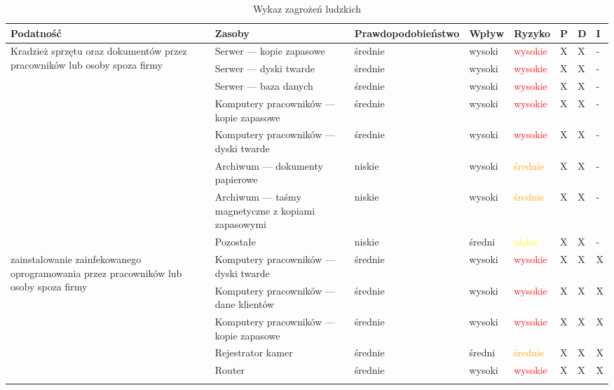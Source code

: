 \begin{landscape}
	\begin{longtable}[ht!]{|m{4cm}|m{6cm}|m{4.5cm}|m{2.5cm}|m{2.5cm}|m{0.5cm}|m{0.5cm}|m{0.5cm}|}
		\caption{Wykaz zagrożeń ludzkich}
		\label{tab::zagrozenia_ludzkie2} \\
		\hline
		\textbf{Podatność} & \textbf{Zasoby} & \textbf{Prawdopodobieństwo} & \textbf{Wpływ} &  \textbf{Ryzyko} & \textbf{P} & \textbf{D} & \textbf{I} \\ \hline
		\multirow{8}{4cm}{Kradzież sprzętu oraz dokumentów przez pracowników lub osoby spoza firmy}            
		& Serwer --- kopie zapasowe & średnie & wysoki & \textcolor{red}{wysokie} & X & X & -  \\ \cline{2-8}
		& Serwer --- dyski twarde & średnie & wysoki & \textcolor{red}{wysokie} & X & X & -  \\ \cline{2-8} 
		& Serwer --- baza danych & średnie & wysoki & \textcolor{red}{wysokie} & X & X & -  \\ \cline{2-8} 
		& Komputery pracowników --- kopie zapasowe & średnie & wysoki & \textcolor{red}{wysokie} & X & X & -  \\ \cline{2-8}
		& Komputery pracowników --- dyski twarde & średnie & wysoki & \textcolor{red}{wysokie} & X & X & -  \\ \cline{2-8}
		& Archiwum --- dokumenty papierowe & niskie & wysoki & \textcolor{orange}{średnie} & X & X & -  \\ \cline{2-8}
		& Archiwum --- taśmy magnetyczne z kopiami zapasowymi  & niskie  & wysoki & \textcolor{orange}{średnie} & X & X & -  \\ \cline{2-8}
		& Pozostałe & niskie  & średni & \textcolor{yellow}{niskie} & X & X & -  \\ \hline
		\multirow{7}{4cm}{zainstalowanie zainfekowanego oprogramowania przez pracowników lub osoby spoza firmy} 
		& Komputery pracowników --- dyski twarde & średnie & wysoki & \textcolor{red}{wysokie} & X & X & X  \\ \cline{2-8}
		& Komputery pracowników --- dane klientów & średnie & wysoki & \textcolor{red}{wysokie} & X & X & X  \\ \cline{2-8}
		& Komputery pracowników --- kopie zapasowe & średnie & wysoki & \textcolor{red}{wysokie} & X & X & X  \\ \cline{2-8}
		& Rejestrator kamer & średnie & średni & \textcolor{orange}{średnie} & X & X & X  \\ \cline{2-8}
		& Router & średnie & wysoki & \textcolor{red}{wysokie} & X & X & X  \\ \cline{2-8}

\end{longtable}
\end{landscape}
